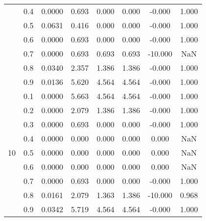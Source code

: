 \documentclass[11pt,a4paper]{report}
\begin{document}
\begin{longtable}{ | c | c || c | c | c | c | c | c | }
 & 0.4 & 0.0000 & 0.693 & 0.000 & 0.000 & -0.000 & 1.000 \\
 & 0.5 & 0.0631 & 0.416 & 0.000 & 0.000 & -0.000 & 1.000 \\
 & 0.6 & 0.0000 & 0.693 & 0.000 & 0.000 & -0.000 & 1.000 \\
 & 0.7 & 0.0000 & 0.693 & 0.693 & 0.693 & -10.000 & NaN \\
 & 0.8 & 0.0340 & 2.357 & 1.386 & 1.386 & -0.000 & 1.000 \\
 & 0.9 & 0.0136 & 5.620 & 4.564 & 4.564 & -0.000 & 1.000 \\
 \hline
\multirow{9}{*}{10} & 0.1 & 0.0000 & 5.663 & 4.564 & 4.564 & -0.000 & 1.000 \\
 & 0.2 & 0.0000 & 2.079 & 1.386 & 1.386 & -0.000 & 1.000 \\
 & 0.3 & 0.0000 & 0.693 & 0.000 & 0.000 & -0.000 & 1.000 \\
 & 0.4 & 0.0000 & 0.000 & 0.000 & 0.000 & 0.000 & NaN \\
 & 0.5 & 0.0000 & 0.000 & 0.000 & 0.000 & 0.000 & NaN \\
 & 0.6 & 0.0000 & 0.000 & 0.000 & 0.000 & 0.000 & NaN \\
 & 0.7 & 0.0000 & 0.693 & 0.000 & 0.000 & -0.000 & 1.000 \\
 & 0.8 & 0.0161 & 2.079 & 1.363 & 1.386 & -10.000 & 0.968 \\
 & 0.9 & 0.0342 & 5.719 & 4.564 & 4.564 & -0.000 & 1.000 \\
 \hline
\hline
\end{longtable}
\end{document}

